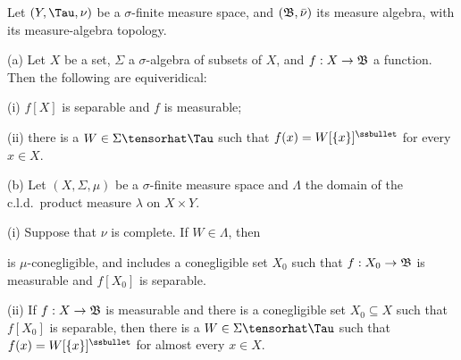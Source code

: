  Let
$(Y,\Tau,\nu)$ be a
$\sigma$-finite measure space, and $(\frak B,\bar\nu)$ its measure
algebra,  with its measure-algebra topology.

(a) Let $X$ be a set, $\Sigma$ a
$\sigma$-algebra of subsets of $X$, and $f:X\to\frak B$ a function.
Then the following are equiveridical:

\quad(i) $f[X]$ is separable and $f$ is measurable;

\quad(ii) there is a $W\in\Sigma\tensorhat\Tau$ such that
$f(x)=W[\{x\}]^{\ssbullet}$ for every $x\in X$.

(b) Let $(X,\Sigma,\mu)$ be a $\sigma$-finite measure space and
$\Lambda$ the domain of the c.l.d.\ product measure $\lambda$ on
$X\times Y$.

\quad(i) Suppose that $\nu$ is complete.   If $W\in\Lambda$, then


\noindent is $\mu$-conegligible, and includes a conegligible set $X_0$
such that $f:X_0\to \frak B$ is measurable and $f[X_0]$ is separable.

\quad(ii) If $f:X\to\frak B$ is measurable and there is a conegligible
set $X_0\subseteq X$ such that $f[X_0]$ is separable, then there is a
$W\in\Sigma\tensorhat\Tau$ such that $f(x)=W[\{x\}]^{\ssbullet}$ for
almost every $x\in X$.


